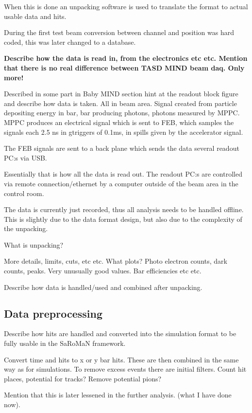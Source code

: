 When this is done an unpacking software is used to translate the format to actual usable data and hits. 

During the first test beam conversion between channel and position was hard coded, this was later changed to a database.  

\textbf{Describe how the data is read in, from the electronics etc etc. Mention that there is no real difference between TASD MIND beam daq. Only more! }

Described in some part in Baby MIND section hint at the readout block figure and describe how data is taken.  All in beam area. Signal created from particle depositing energy in bar, bar producing photons, photons measured by MPPC. MPPC produces an electrical signal which is sent to FEB, which samples the signals each 2.5 ns in gtriggers of 0.1ms, in spills given by the accelerator signal.

The FEB signals are sent to a back plane which sends the data several readout PC:s via USB.

Essentially that is how all the data is read out. The readout PC:s are controlled via remote connection/ethernet by a computer outside of the beam area in the control room.

The data is currently just recorded, thus all analysis needs to be handled offline. This is slightly due to the data format design, but also due to the complexity of the unpacking.

What is unpacking?

More details, limits, cuts, etc etc. What plots? Photo electron counts, dark counts, peaks. Very unusually good values. Bar efficiencies etc etc.

Describe how data is handled/used and combined after unpacking.

\subsection{Data preprocessing}


Describe how hits are handled and converted into the simulation format to be fully usable in the SaRoMaN framework.

Convert time and hits to x or y bar hits. These are then combined in the same way as for simulations. To remove excess events there are initial filters. Count hit places, potential for tracks? Remove potential pions? 

Mention that this is later lessened in the further analysis. (what I have done now).

